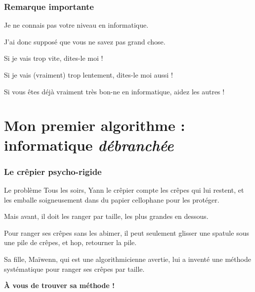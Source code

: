 \documentclass{beamer}
\newcommand{\mypause}{\pause}
\begin{document}
\frame
{
  \frametitle{Remarque importante}

Je ne connais pas votre niveau en informatique. \mypause{}

J'ai donc supposé que vous ne savez pas grand chose. \mypause{}

\hspace{10pt}

Si je vais trop vite, dites-le moi ! \mypause{}

Si je vais (vraiment) trop lentement, dites-le moi aussi ! \mypause{}

\hspace{10pt}

Si vous êtes déjà vraiment très bon-ne en informatique, aidez les autres !
}

\section{Mon premier algorithme : informatique {\em débranchée}}
\frame
{
\frametitle{Le crêpier psycho-rigide}
\begin{block}{Le problème}
\mypause{}
Tous les soirs, Yann le crêpier compte les crêpes qui lui restent, 
et les emballe soigneusement dans du papier cellophane pour les
protéger. 
\mypause{}

Mais avant, il doit les ranger par taille, les plus grandes
en dessous.
\mypause{}

Pour ranger ses crêpes sans les abimer, il peut 
seulement glisser une spatule sous une pile de crêpes, et
hop, retourner la pile.

\mypause{}
Sa fille, Maïwenn, qui est une algorithmicienne avertie, lui a inventé une
méthode systématique pour ranger ses crêpes par taille.

\textbf{À vous de trouver sa méthode !}

\end{block}
}

\end{document}
